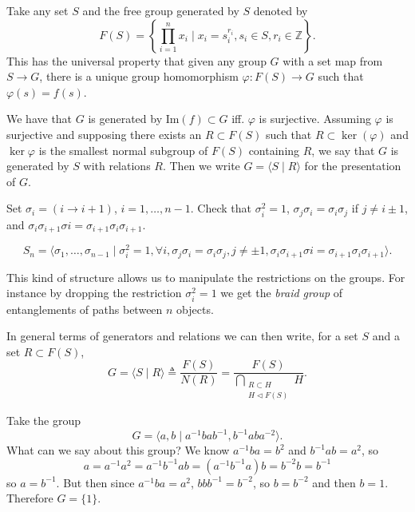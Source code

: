 \begin{defn}
Take any set $S$ and the
free group generated by $S$ denoted by
$$
F(S) = \left\{ \prod_{i = 1}^n x_i
         \mid x_i = s_i^{r_i}, s_i \in S,  r_i \in \mathbb{Z}
       \right\}.
$$
This has the universal property that given any group $G$ with a set
map from $S \to G$, there is a unique group homomorphism
$\varphi : F(S) \to G$ such that $\varphi(s) = f(s)$.

We have that $G$ is generated by $\mathrm{Im}(f) \subset G$
iff. $\varphi$ is surjective. Assuming $\varphi$ is surjective and
supposing there exists an $R \subset F(S)$ such that $R \subset
\ker(\varphi)$ and $\ker \varphi$ is the smallest normal subgroup of
$F(S)$ containing $R$, we say that $G$ is generated by $S$ with
relations $R$. Then we write $G = \langle S \mid R \rangle$ for the
presentation of $G$.
\end{defn}

\begin{xmpl}[Presentation of $S_n$]
Set $\sigma_i = (i \to i + 1)$, $i = 1, \dots, n - 1$. Check that
$\sigma_i^2 = 1$, $\sigma_j \sigma_i = \sigma_i \sigma_j$ if
$j \neq i \pm 1$, and
$\sigma_i \sigma_{i+1} \sigma{i} = \sigma_{i+1} \sigma_i
\sigma_{i+1}$.

\begin{theorem}
$$S_n = \langle \sigma_1, \dots, \sigma_{n-1}
         \mid \sigma_i^2 = 1, \forall i,
              \sigma_j \sigma_i = \sigma_i \sigma_j, j \neq \pm 1,
              \sigma_i \sigma_{i+1} \sigma{i} = \sigma_{i+1} \sigma_i
              \sigma_{i+1}
       \rangle.
$$
\end{theorem}
This kind of structure allows us to manipulate the restrictions on the
groups. For instance by dropping the restriction $\sigma_i^2 = 1$ we
get the \emph{braid group} of entanglements of paths between $n$ objects.
\end{xmpl}

In general terms of generators and relations we can then write, for a
set $S$ and a set $R \subset F(S)$,
$$
G = \langle S \mid R \rangle
  \triangleq \frac{F(S)}{N(R)}
  = \frac{F(S)}{\bigcap_{\substack{R \subset H \\ H \triangleleft F(S)}} H}.
$$

\begin{xmpl}
Take the group
$$
G = \langle a, b \mid a^{-1} b a b^{-1}, b^{-1} a b a^{-2} \rangle.
$$
What can we say about this group? We know $a^{-1} b a = b^2$ and
$b^{-1} a b = a^2$, so
$$
a = a^{-1} a^2 = a^{-1} b^{-1} a b = (a^{-1} b^{-1} a) b = b^{-2} b = b^{-1}
$$
so $a = b^{-1}$. But then since $a^{-1} b a = a^2$, $b b b^{-1} =
b^{-2}$, so $b = b^{-2}$ and then $b = 1$. Therefore $G = \{ 1 \}$.
\end{xmpl}

